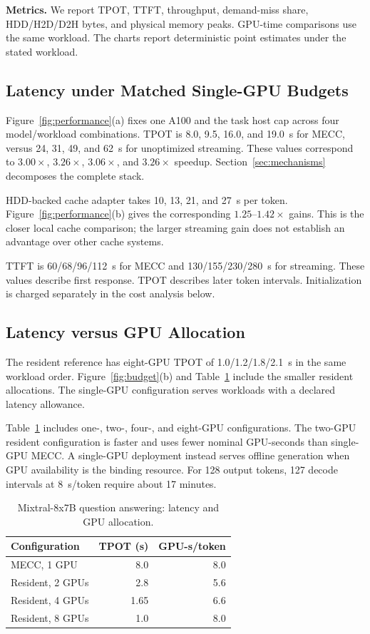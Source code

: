 \documentclass[conference,9pt,letterpaper]{IEEEtran}
\newcommand{\mecc}{\textsc{MECC}}
\begin{document}
\textbf{Metrics.} We report TPOT, TTFT, throughput, demand-miss share, HDD/H2D/D2H bytes, and physical memory peaks. GPU-time comparisons use the same workload. The charts report deterministic point estimates under the stated workload.

\subsection{Latency under Matched Single-GPU Budgets}
Figure~\ref{fig:performance}(a) fixes one A100 and the task host cap across four model/workload combinations. TPOT is 8.0, 9.5, 16.0, and 19.0~s for \mecc{}, versus 24, 31, 49, and 62~s for unoptimized streaming. These values correspond to $3.00\times$, $3.26\times$, $3.06\times$, and $3.26\times$ speedup. Section~\ref{sec:mechanisms} decomposes the complete stack.

HDD-backed cache adapter takes 10, 13, 21, and 27~s per token. Figure~\ref{fig:performance}(b) gives the corresponding $1.25$--$1.42\times$ gains. This is the closer local cache comparison; the larger streaming gain does not establish an advantage over other cache systems.

TTFT is 60/68/96/112~s for \mecc{} and 130/155/230/280~s for streaming. These values describe first response. TPOT describes later token intervals. Initialization is charged separately in the cost analysis below.

\subsection{Latency versus GPU Allocation}
The resident reference has eight-GPU TPOT of 1.0/1.2/1.8/2.1~s in the same workload order. Figure~\ref{fig:budget}(b) and Table~\ref{tab:gpu} include the smaller resident allocations. The single-GPU configuration serves workloads with a declared latency allowance.

Table~\ref{tab:gpu} includes one-, two-, four-, and eight-GPU configurations. The two-GPU resident configuration is faster and uses fewer nominal GPU-seconds than single-GPU \mecc{}. A single-GPU deployment instead serves offline generation when GPU availability is the binding resource. For 128 output tokens, 127 decode intervals at 8~s/token require about 17 minutes.

\begin{table}[t]
\caption{Mixtral-8x7B question answering: latency and GPU allocation.}
\label{tab:gpu}\centering
\begin{tabular}{lrr}\toprule
Configuration & TPOT (s) & GPU-s/token\\\midrule
\mecc{}, 1 GPU & 8.0 & 8.0\\
Resident, 2 GPUs & 2.8 & 5.6\\
Resident, 4 GPUs & 1.65 & 6.6\\
Resident, 8 GPUs & 1.0 & 8.0\\\bottomrule
\end{tabular}
\end{table}
\end{document}
